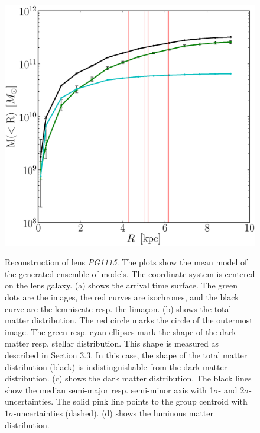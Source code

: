 \documentclass[useAMS,usenatbib]{mn2e}
\begin{document}
\begin{figure}
\begin{center}
  \includegraphics[height=0.32\textwidth]{Figures/1115_h.eps}\\
  \caption{Reconstruction of lens \textit{PG1115}. The plots show the mean model of the generated ensemble of models. The coordinate system is centered on the lens galaxy. (a) shows the arrival time surface. The green dots are the images, the red curves are isochrones, and the black curve are the lemniscate resp. the lima\c{c}on. (b) shows the total matter distribution. The red circle marks the circle of the outermost image. The green resp. cyan ellipses mark the shape of the dark matter resp. stellar distribution. This shape is measured as described in Section 3.3. In this case, the shape of the total matter distribution (black) is indistinguishable from the dark matter distribution. (c) shows the dark matter distribution. The black lines show the median semi-major resp. semi-minor axis with 1$\sigma$- and 2$\sigma$- uncertainties. The solid pink line points to the group centroid with $1\sigma$-uncertainties (dashed). (d) shows the luminous matter distribution.}
  \label{fig:1115rec}
 \end{center}
\end{figure}
\end{document}
